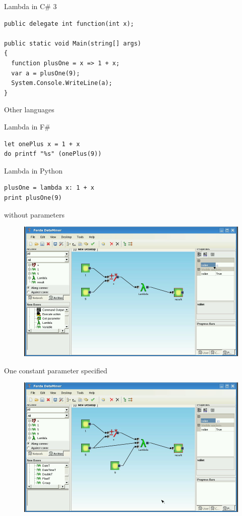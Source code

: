 \documentclass{article}
\begin{document}
Lambda in C\# 3
\begin{verbatim}
public delegate int function(int x);

public static void Main(string[] args)
{
  function plusOne = x => 1 + x;
  var a = plusOne(9);
  System.Console.WriteLine(a);
}
\end{verbatim}
	
Other languages

Lambda in F\#
\begin{verbatim}
let onePlus x = 1 + x
do printf "%s" (onePlus(9)) 
\end{verbatim}

Lambda in Python
\begin{verbatim}
plusOne = lambda x: 1 + x
print plusOne(9)
\end{verbatim}

without parameters
\begin{figure}
\includegraphics[width=12cm]{lambdaBasic2.png}
	\caption{}
\end{figure}

One constant parameter specified
\begin{figure}
\includegraphics[width=12cm]{lambdaBasic3.png}
	\caption{}
\end{figure}
	
\end{document}
